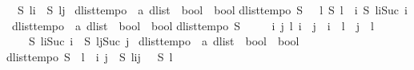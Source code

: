 \begin{isabellebody}
\ \ {\isacharparenleft}S\ {\isacharparenleft}l{\isasymdagger}{\isachardot}{\isachardot}i{\isacharparenright}\ {\isasymand}\ S\ {\isacharparenleft}l{\isasymdagger}j{\isachardot}{\isachardot}{\isacharparenright}{\isacharparenright}{\isacharparenright}{\isachardoublequoteclose}\isanewline
\isanewline
{}\isamarkupfalse%
\ dlist{\isacharunderscore}tempo{}\ {\isacharcolon}{\isacharcolon}\ {\isachardoublequoteopen}{\isacharparenleft}{\isacharprime}a\ dlist\ {\isasymRightarrow}\ bool{\isacharparenright}\ {\isasymRightarrow}\ bool{\isachardoublequoteclose}\isanewline
{}\isanewline
{\isachardoublequoteopen}dlist{\isacharunderscore}tempo{}\ S\ {\isasymequiv}\ {\isasymforall}\ l{\isachardot}\ S\ l\ {\isasymlongleftrightarrow}\ {\isacharparenleft}{\isasymexists}i{\isachardot}\ S\ {\isacharparenleft}l{\isasymdagger}i{\isachardot}{\isachardot}{\isacharparenleft}Suc\ i{\isacharparenright}{\isacharparenright}{\isacharparenright}{\isachardoublequoteclose}\isanewline
\isanewline
{}\isamarkupfalse%
\ dlist{\isacharunderscore}tempo{}\ {\isacharcolon}{\isacharcolon}\ {\isachardoublequoteopen}{\isacharparenleft}{\isacharprime}a\ dlist\ {\isasymRightarrow}\ bool{\isacharparenright}\ {\isasymRightarrow}\ bool{\isachardoublequoteclose}\isanewline
{}\isanewline
{\isachardoublequoteopen}dlist{\isacharunderscore}tempo{}\ S\ {\isasymequiv}\ \isanewline
\ \ {\isasymforall}\ i\ j\ l{\isachardot}\ {\isacharparenleft}i\ {\isasymnoteq}\ j\ {\isasymand}\ i\ {\isacharless}\ {\isacharparenleft}{\isacharhash}l{\isacharparenright}\ {\isasymand}\ j\ {\isacharless}\ {\isacharparenleft}{\isacharhash}l{\isacharparenright}{\isacharparenright}\ {\isasymlongrightarrow}\ \isanewline
\ \ \ \ {\isasymnot}{\isacharparenleft}S\ {\isacharparenleft}l{\isasymdagger}i{\isachardot}{\isachardot}{\isacharparenleft}Suc\ i{\isacharparenright}{\isacharparenright}\ {\isasymand}\ S\ {\isacharparenleft}l{\isasymdagger}j{\isachardot}{\isachardot}{\isacharparenleft}Suc\ j{\isacharparenright}{\isacharparenright}{\isacharparenright}{\isachardoublequoteclose}\isanewline
\isanewline
{}\isamarkupfalse%
\ dlist{\isacharunderscore}tempo{}\ {\isacharcolon}{\isacharcolon}\ {\isachardoublequoteopen}{\isacharparenleft}{\isacharprime}a\ dlist\ {\isasymRightarrow}\ bool{\isacharparenright}\ {\isasymRightarrow}\ bool{\isachardoublequoteclose}\isanewline
{}\isanewline
{\isachardoublequoteopen}dlist{\isacharunderscore}tempo{}\ S\ {\isasymequiv}\ {\isasymforall}l{\isachardot}\ {\isacharparenleft}{\isasymforall}\ i\ j{\isachardot}\ {\isasymnot}\ S\ {\isacharparenleft}l{\isasymdagger}i{\isachardot}{\isachardot}j{\isacharparenright}{\isacharparenright}\ {\isasymlongleftrightarrow}\ {\isasymnot}\ S\ l{\isachardoublequoteclose}\isanewline

\end{isabellebody}
